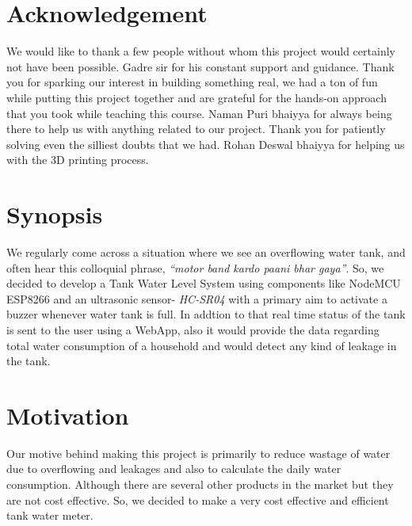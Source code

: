 \documentclass[12pt]{article}
\begin{document}
\vspace{4cm}
\section*{Acknowledgement}
We would like to thank a few people without whom this project would certainly not have been possible. Gadre sir for his constant support and guidance. Thank you for sparking our interest in building something real, we had a ton of fun while putting this project together and are grateful for the hands-on approach that you took while teaching this course. Naman Puri bhaiyya for always being there to help us with anything related to our project. Thank you for patiently solving even the silliest doubts that we had. Rohan Deswal bhaiyya for helping us with the 3D printing process.
\vspace{20cm}

\section*{Synopsis}
\normalsize
We regularly come across a situation where we see an overflowing water tank, and often hear this colloquial phrase, \emph{“motor band kardo paani bhar gaya”}. So, we decided to develop a Tank Water Level System using components like  NodeMCU ESP8266 and an ultrasonic sensor- \emph{HC-SR04} with a primary aim to activate a buzzer whenever water tank is full. In addtion to that real time status of the tank is sent to the user using a WebApp, also it would provide the data regarding total water consumption of a household and would detect any kind of leakage in the tank. 
\section*{Motivation}
\normalsize
Our motive behind making this project is primarily to reduce wastage of water due to overflowing and leakages and also to calculate the daily water consumption. Although there are several other products in the market but they are not cost effective. So, we decided to make a very cost effective and efficient tank water meter.
\end{document}
